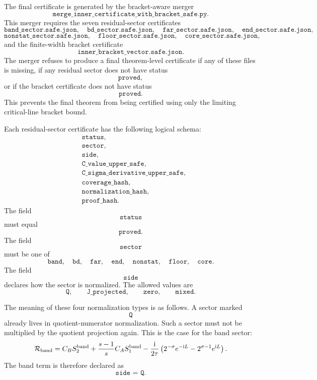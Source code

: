 \documentclass[11pt]{article}
\newcommand{\ii}{\mathrm{i}}
\newcommand{\s}{s}
\newcommand{\sig}{\sigma}
\newcommand{\tauh}{\tau}
\newcommand{\Rband}{\mathcal R_{\rm band}}
\newcommand{\JSON}[1]{\texttt{#1}}
\newcommand{\code}[1]{\texttt{#1}}
\newcommand{\Qside}{\texttt{Q}}
\newcommand{\Jproj}{\texttt{J\_projected}}
\newcommand{\Zeroside}{\texttt{zero}}
\newcommand{\Mixedside}{\texttt{mixed}}
\begin{document}
The final certificate is generated by the bracket-aware merger
\[
        \code{merge\_inner\_certificate\_with\_bracket\_safe.py}.
\]
This merger requires the seven residual-sector certificates
\[
        \code{band\_sector.safe.json},\quad
        \code{bd\_sector.safe.json},\quad
        \code{far\_sector.safe.json},\quad
        \code{end\_sector.safe.json},
\]
\[
        \code{nonstat\_sector.safe.json},\quad
        \code{floor\_sector.safe.json},\quad
        \code{core\_sector.safe.json},
\]
and the finite-width bracket certificate
\[
        \code{inner\_bracket\_vector.safe.json}.
\]
The merger refuses to produce a final theorem-level certificate if any of these
files is missing, if any residual sector does not have status
\[
        \JSON{proved},
\]
or if the bracket certificate does not have status
\[
        \JSON{proved}.
\]
This prevents the final theorem from being certified using only the limiting
critical-line bracket bound.

Each residual-sector certificate has the following logical schema:
\[
\begin{aligned}
        &\JSON{status},\\
        &\JSON{sector},\\
        &\JSON{side},\\
        &\JSON{C\_value\_upper\_safe},\\
        &\JSON{C\_sigma\_derivative\_upper\_safe},\\
        &\JSON{coverage\_hash},\\
        &\JSON{normalization\_hash},\\
        &\JSON{proof\_hash}.
\end{aligned}
\]
The field
\[
        \JSON{status}
\]
must equal
\[
        \JSON{proved}.
\]
The field
\[
        \JSON{sector}
\]
must be one of
\[
        \JSON{band},\quad
        \JSON{bd},\quad
        \JSON{far},\quad
        \JSON{end},\quad
        \JSON{nonstat},\quad
        \JSON{floor},\quad
        \JSON{core}.
\]
The field
\[
        \JSON{side}
\]
declares how the sector is normalized.  The allowed values are
\[
        \Qside,\qquad
        \Jproj,\qquad
        \Zeroside,\qquad
        \Mixedside .
\]

The meaning of these four normalization types is as follows.  A sector marked
\[
        \Qside
\]
already lives in quotient-numerator normalization.  Such a sector must not be
multiplied by the quotient projection again.  This is the case for the band
sector:
\[
        \Rband
        =
        C_B S_2^{\rm band}
        +
        \frac{\s-1}{\s}C_A S_1^{\rm band}
        -
        \frac{\ii}{2\tauh}
        \left(
            2^{-\sig}e^{-\ii L}
            -
            2^{\sig-1}e^{\ii L}
        \right).
\]
The band term is therefore declared as
\[
        \JSON{side = Q}.
\]
\end{document}
